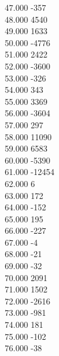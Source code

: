 { 47.000	-357 \\
 48.000	4540 \\
 49.000	1633 \\
 50.000	-4776 \\
 51.000	2422 \\
 52.000	-3600 \\
 53.000	-326 \\
 54.000	343 \\
 55.000	3369 \\
 56.000	-3604 \\
 57.000	297 \\
 58.000	11090 \\
 59.000	6583 \\
 60.000	-5390 \\
 61.000	-12454 \\
 62.000	6 \\
 63.000	172 \\
 64.000	-152 \\
 65.000	195 \\
 66.000	-227 \\
 67.000	-4 \\
 68.000	-21 \\
 69.000	-32 \\
 70.000	2091 \\
 71.000	1502 \\
 72.000	-2616 \\
 73.000	-981 \\
 74.000	181 \\
 75.000	-102 \\
 76.000	-38 \\
}
